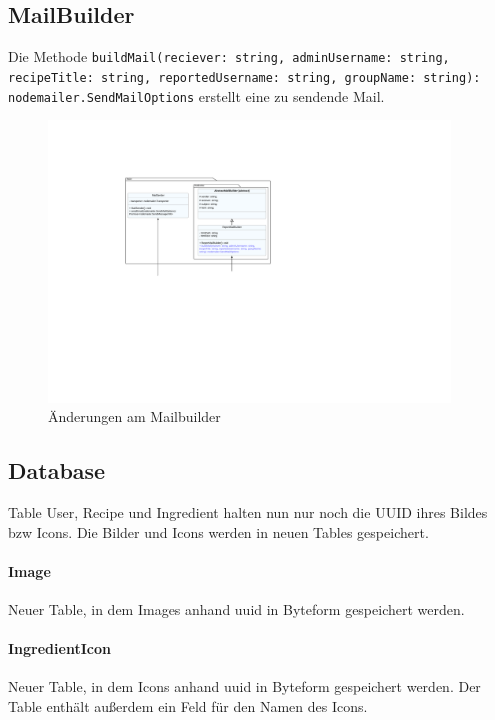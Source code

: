\documentclass{implementierungsheft}
\begin{document}
\newpage

\subsection{MailBuilder} Die Methode \texttt{buildMail(reciever: string, adminUsername: string, recipeTitle: string, reportedUsername: string, groupName: string): nodemailer.SendMailOptions} erstellt eine zu sendende Mail.


\begin{figure}[htp]
    \centering
    \includegraphics[width=0.95\textwidth]{images/uml/mailbilder.pdf}
    \caption{Änderungen am Mailbuilder}
    \label{fig:mailbuilder}
\end{figure}


\subsection{Database} Table User, Recipe und Ingredient halten nun nur noch die UUID ihres Bildes bzw Icons. Die Bilder und Icons werden in neuen Tables gespeichert.

\paragraph{Image} Neuer Table, in dem Images anhand uuid in Byteform gespeichert werden.

\paragraph{IngredientIcon}  Neuer Table, in dem Icons anhand uuid in Byteform gespeichert werden. Der Table enthält außerdem ein Feld für den Namen des Icons.
\end{document}
